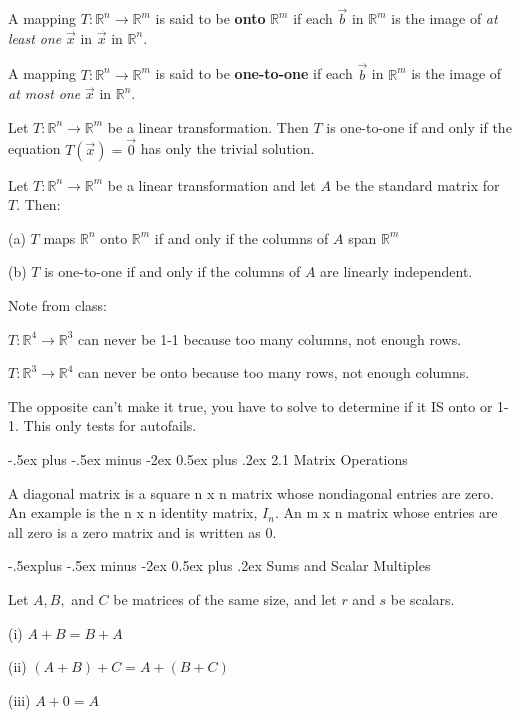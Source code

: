 \documentclass[10pt,landscape]{article}
\makeatletter
\renewcommand{\section}{\@startsection{section}{1}{0mm}%
                                {-.5ex plus -.5ex minus -2ex}%
                                {0.5ex plus .2ex}%
                                {\normalfont\footnotesize\bfseries}}
\renewcommand{\subsection}{\@startsection{subsection}{2}{0mm}%
                                {-.5explus -.5ex minus -2ex}%
                                {0.5ex plus .2ex}%
                                {\normalfont\footnotesize\bfseries}}
\makeatother
\begin{document}
\begin{multicols}{4}
{{A mapping $T \colon \mathbb{R}^n \to \mathbb{R}^m$ is said to be \textbf{onto} $\mathbb{R}^m$ if each $\vec{b}$ in $\mathbb{R}^m$ is the image of \textit{at least one} $\vec{x}$ in $\vec{x}$  in $\mathbb{R}^n$. 

A mapping $T \colon \mathbb{R}^n \to \mathbb{R}^m$ is said to be \textbf{one-to-one} if each $\vec{b}$ in $\mathbb{R}^m$ is the image of \textit{at most one} $\vec{x}$ in $\mathbb{R}^n$.

Let $T \colon \mathbb{R}^n \to \mathbb{R}^m$ be a linear transformation. Then $T$ is one-to-one if and only if the equation $T(\vec{x})=\vec{0}$ has only the trivial solution.

Let $T \colon \mathbb{R}^n \to \mathbb{R}^m$ be a linear transformation and let $A$ be the standard matrix for $T$. Then:

(a) $T$ maps $\mathbb{R}^n$ onto $\mathbb{R}^m$ if and only if the columns of $A$ span $\mathbb{R}^m$

(b) $T$ is one-to-one if and only if the columns of $A$ are linearly independent.

Note from class: 

$T \colon \mathbb{R}^4 \to \mathbb{R}^3$ can never be 1-1 because too many columns, not enough rows.

$T \colon \mathbb{R}^3 \to \mathbb{R}^4$ can never be onto because too many rows, not enough columns.

The opposite can't make it true, you have to solve to determine if it IS onto or 1-1. This only tests for autofails.


\section{2.1 Matrix Operations}

A diagonal matrix is a square n x n matrix whose nondiagonal entries are zero. An example is the n x n identity matrix, $I_n$. An m x n matrix whose entries are all zero is a zero matrix and is written as 0.  

\subsection{Sums and Scalar Multiples}

Let $A, B,$ and $C$ be matrices of the same size, and let $r$ and $s$ be scalars.

(i) $A+B=B+A$

(ii) $(A+B)+C=A+(B+C)$

(iii) $A+0=A$

}}
\end{multicols}
\end{document}

